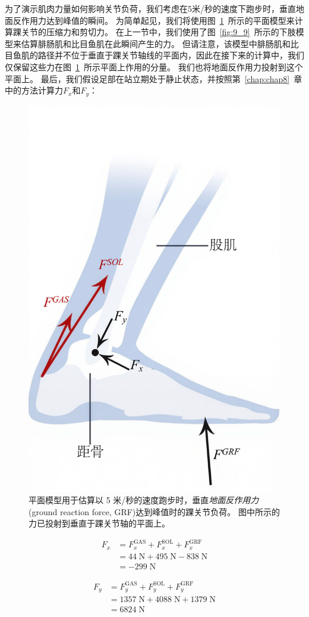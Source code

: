 为了演示肌肉力量如何影响关节负荷，我们考虑在5米/秒的速度下跑步时，垂直地面反作用力达到峰值的瞬间。
为简单起见，我们将使用图~\ref{fig:9_14}~所示的平面模型来计算踝关节的压缩力和剪切力。
在上一节中，我们使用了图~\ref{fig:9_9}~所示的下肢模型来估算腓肠肌和比目鱼肌在此瞬间产生的力。
但请注意，该模型中腓肠肌和比目鱼肌的路径并不位于垂直于踝关节轴线的平面内，因此在接下来的计算中，我们仅保留这些力在图~\ref{fig:9_14}~所示平面上作用的分量。
我们也将地面反作用力投射到这个平面上。
最后，我们假设足部在站立期处于静止状态，并按照第~\ref{chap:chap8}~章中的方法计算力$F_x$和$F_y$：


\begin{figure}[!htb]
	\centering
	\includegraphics[width=0.3\linewidth]{chap9/9_14}
	\caption{平面模型用于估算以 5 米/秒的速度跑步时，垂直\textit{地面反作用力}(ground reaction force, GRF)达到峰值时的踝关节负荷。
		图中所示的力已投射到垂直于踝关节轴的平面上。 \label{fig:9_14}}
\end{figure}

\begin{equation}
	\begin{aligned}
		F_x & = F_x^\text{GAS} + 
				F_x^\text{SOL} + 
				F_x^\text{GRF} \\
			& = 44 \; \text{N} + 495\;\text{N} - 838 \; \text{N} \\
			& = -299 \;\text{N}
	\end{aligned}
	\label{eq:9_3}
\end{equation}


\begin{equation}
	\begin{aligned}
		F_y & = F_y^\text{GAS} + F_y^\text{SOL} + F_y^\text{GRF} \\
		& = 1357 \; \text{N} + 4088 \; \text{N} + 1379 \; \text{N} \\
		& = 6824 \; \text{N}
	\end{aligned}
	\label{eq:9_4}
\end{equation}


